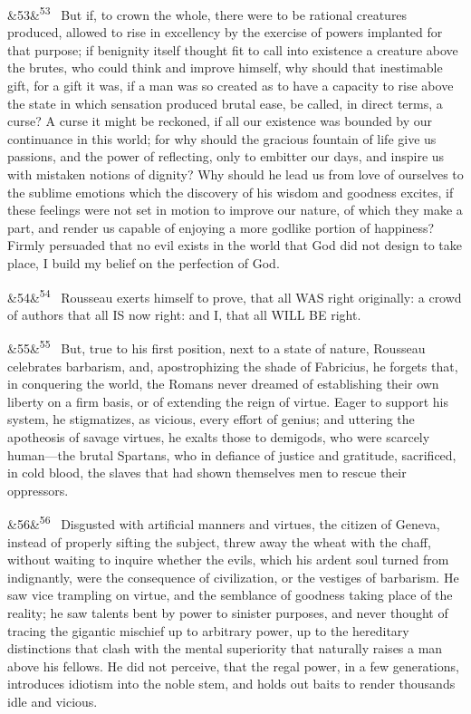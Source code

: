 \documentclass[12pt]{article}
\newcommand{\para}[1][]{\par\noindent\ifx&#1&\else\textsuperscript{\footnotesize #1}~\fi}
\begin{document}
\para[53] But if, to crown the whole, there were to be rational creatures produced, allowed to rise in excellency by the exercise of powers implanted for that purpose; if benignity itself thought fit to call into existence a creature above the brutes, who could think and improve himself, why should that inestimable gift, for a gift it was, if a man was so created as to have a capacity to rise above the state in which sensation produced brutal ease, be called, in direct terms, a curse? A curse it might be reckoned, if all our existence was bounded by our continuance in this world; for why should the gracious fountain of life give us passions, and the power of reflecting, only to embitter our days, and inspire us with mistaken notions of dignity? Why should he lead us from love of ourselves to the sublime emotions which the discovery of his wisdom and goodness excites, if these feelings were not set in motion to improve our nature, of which they make a part, and render us capable of enjoying a more godlike portion of happiness? Firmly persuaded that no evil exists in the world that God did not design to take place, I build my belief on the perfection of God.

\para[54] Rousseau exerts himself to prove, that all WAS right originally: a crowd of authors that all IS now right: and I, that all WILL BE right.

\para[55] But, true to his first position, next to a state of nature, Rousseau celebrates barbarism, and, apostrophizing the shade of Fabricius, he forgets that, in conquering the world, the Romans never dreamed of establishing their own liberty on a firm basis, or of extending the reign of virtue. Eager to support his system, he stigmatizes, as vicious, every effort of genius; and uttering the apotheosis of savage virtues, he exalts those to demigods, who were scarcely human---the brutal Spartans, who in defiance of justice and gratitude, sacrificed, in cold blood, the slaves that had shown themselves men to rescue their oppressors.

\para[56] Disgusted with artificial manners and virtues, the citizen of Geneva, instead of properly sifting the subject, threw away the wheat with the chaff, without waiting to inquire whether the evils, which his ardent soul turned from indignantly, were the consequence of civilization, or the vestiges of barbarism. He saw vice trampling on virtue, and the semblance of goodness taking place of the reality; he saw talents bent by power to sinister purposes, and never thought of tracing the gigantic mischief up to arbitrary power, up to the hereditary distinctions that clash with the mental superiority that naturally raises a man above his fellows. He did not perceive, that the regal power, in a few generations, introduces idiotism into the noble stem, and holds out baits to render thousands idle and vicious.
\end{document}
